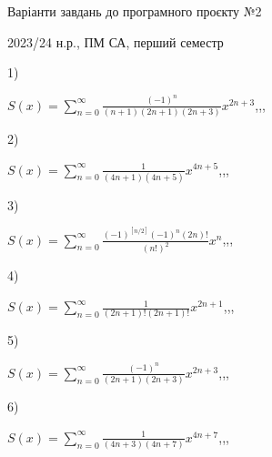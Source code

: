 \documentclass[11pt, ukrainian]{article}
\begin{document}
{\Large \center  Варіанти завдань до програмного проєкту №2\par 2023/24 н.р., ПМ СА, перший семестр\par \bigskip}
1) \space 
{%
{$S(x)=\sum\limits_{n=0}^{\infty}{\frac{(-1)^n}{(n+1)(2n+1)(2n+3)}}{x^{{2n+3}}}$},,, \par \smallskip  
}
\par
\vspace{0.9cm}
2) \space 
{%
{$S(x)=\sum\limits_{n=0}^{\infty}{\frac{1}{(4n+1)(4n+5)}}{x^{{4n+5}}}$},,, \par \smallskip  
}
\par
\vspace{0.9cm}
3) \space 
{%
{$S(x)=\sum\limits_{n=0}^{\infty}{\frac{{(-1)^{[n/2]}}{(-1)^n}(2n)!}{(n!)^2}}{x^{n}}$},,, \par \smallskip  
}
\par
\vspace{0.9cm}
4) \space 
{%
{$S(x)=\sum\limits_{n=0}^{\infty}{\frac{1}{(2n+1)!(2n+1)!}}{x^{{2n+1}}}$},,, \par \smallskip  
}
\par
\vspace{0.9cm}
5) \space 
{%
{$S(x)=\sum\limits_{n=0}^{\infty}{\frac{(-1)^n}{(2n+1)(2n+3)}}{x^{{2n+3}}}$},,, \par \smallskip  
}
\par
\vspace{0.9cm}
6) \space 
{%
{$S(x)=\sum\limits_{n=0}^{\infty}{\frac{1}{(4n+3)(4n+7)}}{x^{{4n+7}}}$},,, \par \smallskip  
}
\end{document}
